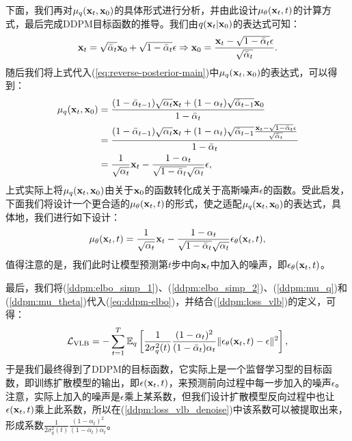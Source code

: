 \documentclass[11pt,a4paper,UTF8]{ctexart}
\begin{document}
下面，我们再对$\mu_q(\mathbf{x}_t,\mathbf{x}_0)$的具体形式进行分析，并由此设计$\mu_{\theta}(\mathbf{x}_t,t)$的计算方式，最后完成DDPM目标函数的推导。我们由$q(\mathbf{x}_t|\mathbf{x}_0)$的表达式可知：
\begin{equation*}
    \mathbf{x}_t =\sqrt{\bar{\alpha}_t}\mathbf{x}_0 + \sqrt{1-\bar{\alpha}_t}\epsilon \Rightarrow  \mathbf{x}_0 =\frac{\mathbf{x}_t - \sqrt{1-\bar{\alpha}_t}\epsilon}{\sqrt{\bar{\alpha}_t}}.
\end{equation*}
随后我们将上式代入(\ref{eq:reverse-posterior-main})中$\mu_q(\mathbf{x}_t,\mathbf{x}_0)$的表达式，可以得到：
\begin{align}
\begin{split}
    \mu_q(\mathbf{x}_t,\mathbf{x}_0) &= \frac{(1-\bar{\alpha}_{t-1})\sqrt{\alpha_t}\mathbf{x}_t +(1-\alpha_t)\sqrt{\bar{\alpha}_{t-1}}\mathbf{x}_0 }{1-\bar{\alpha}_t} \\
    &= \frac{(1-\bar{\alpha}_{t-1})\sqrt{\alpha_t}\mathbf{x}_t +(1-\alpha_t)\sqrt{\bar{\alpha}_{t-1}}\frac{\mathbf{x}_t - \sqrt{1-\bar{\alpha}_t}\epsilon}{\sqrt{\bar{\alpha}_t}} }{1-\bar{\alpha}_t}\\
    &= \frac{1}{\sqrt{\alpha_t}}\mathbf{x}_t - \frac{1-\alpha_t}{\sqrt{1-\bar{\alpha}_t}\sqrt{\alpha_t}}\epsilon,
\end{split}
\label{ddpm:mu_q}
\end{align}
上式实际上将$\mu_q(\mathbf{x}_t,\mathbf{x}_0)$由关于$\mathbf{x}_0$的函数转化成关于高斯噪声$\epsilon$的函数。受此启发，下面我们将设计一个更合适的$\mu_{\theta}(\mathbf{x}_t,t)$的形式，使之适配$\mu_q(\mathbf{x}_t,\mathbf{x}_0)$的表达式，具体地，我们进行如下设计：
\begin{equation}
\mu_{\theta}(\mathbf{x}_t,t)=\frac{1}{\sqrt{\alpha_t}}\mathbf{x}_t - \frac{1-\alpha_t}{\sqrt{1-\bar{\alpha}_t}\sqrt{\alpha_t}}\epsilon_{\theta}(\mathbf{x}_t,t),
\label{ddpm:mu_theta}
\end{equation}
值得注意的是，我们此时让模型预测第$t$步中向$\mathbf{x}_t$中加入的噪声，即$\epsilon_{\theta}(\mathbf{x}_t,t)$。

最后，我们将(\ref{ddpm:elbo_simp_1})、(\ref{ddpm:elbo_simp_2})、(\ref{ddpm:mu_q})和(\ref{ddpm:mu_theta})代入(\ref{eq:ddpm-elbo})，并结合(\ref{ddpm:loss_vlb})的定义，可得：
\begin{equation}
\mathcal{L}_{\text{VLB}} = -\sum_{t=1}^T \mathbb{E}_q \left[\frac{1}{2\sigma_q^2(t)}\frac{(1-\alpha_t)^2}{(1-\bar{\alpha}_t)\alpha_t}\|\epsilon_{\theta}(\mathbf{x}_t,t)-\epsilon \|^2 \right],
\label{ddpm:loss_vlb_denoise}
\end{equation}
于是我们最终得到了DDPM的目标函数，它实际上是一个监督学习型的目标函数，即训练扩散模型的输出，即$\epsilon(\mathbf{x}_t,t)$，来预测前向过程中每一步加入的噪声$\epsilon$。注意，实际上加入的噪声是$\epsilon$乘上某系数，但我们设计扩散模型反向过程中也让$\epsilon(\mathbf{x}_t,t)$乘上此系数，所以在(\ref{ddpm:loss_vlb_denoise})中该系数可以被提取出来，形成系数$\frac{1}{2\sigma_q^2(t)}\frac{(1-\alpha_t)^2}{(1-\bar{\alpha}_t)\alpha_t}$。
\end{document}
